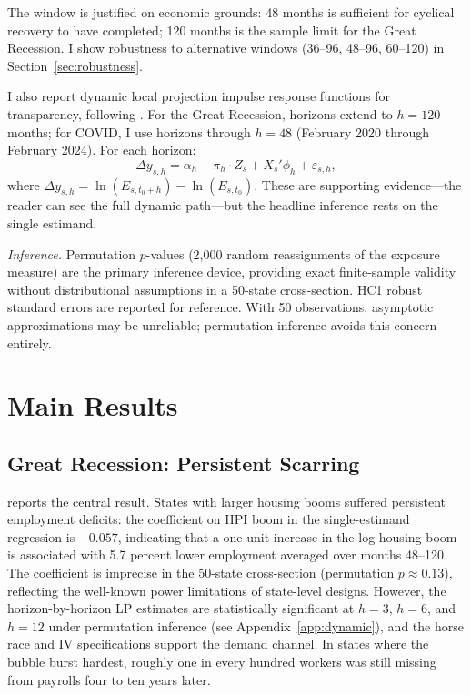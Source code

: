 \documentclass[12pt]{article}
\begin{document}
The window is justified on economic grounds: 48 months is sufficient for cyclical recovery to have completed; 120 months is the sample limit for the Great Recession. I show robustness to alternative windows (36--96, 48--96, 60--120) in Section~\ref{sec:robustness}.

I also report dynamic local projection impulse response functions for transparency, following \citet{jorda2005estimation}. For the Great Recession, horizons extend to $h = 120$ months; for COVID, I use horizons through $h = 48$ (February 2020 through February 2024). For each horizon:
\begin{equation}
\Delta y_{s,h} = \alpha_h + \pi_h \cdot Z_s + X_s'\phi_h + \varepsilon_{s,h},
\label{eq:lp}
\end{equation}
where $\Delta y_{s,h} = \ln(E_{s,t_0+h}) - \ln(E_{s,t_0})$. These are supporting evidence---the reader can see the full dynamic path---but the headline inference rests on the single estimand.

\textit{Inference.} Permutation $p$-values (2,000 random reassignments of the exposure measure) are the primary inference device, providing exact finite-sample validity without distributional assumptions in a 50-state cross-section. HC1 robust standard errors are reported for reference. With 50 observations, asymptotic approximations may be unreliable; permutation inference avoids this concern entirely.


\section{Main Results}
\label{sec:results}

\subsection{Great Recession: Persistent Scarring}

 reports the central result. States with larger housing booms suffered persistent employment deficits: the coefficient on HPI boom in the single-estimand regression is $-0.057$, indicating that a one-unit increase in the log housing boom is associated with 5.7 percent lower employment averaged over months 48--120. The coefficient is imprecise in the 50-state cross-section (permutation $p \approx 0.13$), reflecting the well-known power limitations of state-level designs. However, the horizon-by-horizon LP estimates are statistically significant at $h = 3$, $h = 6$, and $h = 12$ under permutation inference (see Appendix~\ref{app:dynamic}), and the horse race and IV specifications support the demand channel. In states where the bubble burst hardest, roughly one in every hundred workers was still missing from payrolls four to ten years later.
\end{document}
